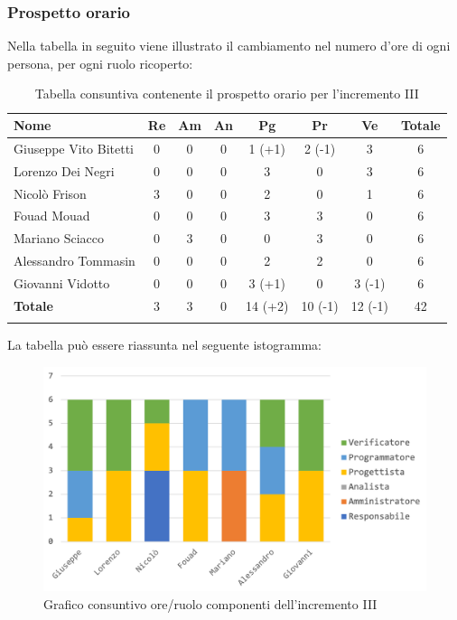 		\subsubsection{Prospetto orario}
			Nella tabella in seguito viene illustrato il cambiamento nel numero d'ore di ogni persona, per ogni ruolo ricoperto:
			
			\begin{longtable}{|l|c|c|c|c|c|c|c|}
				\hline
				\rowcolor{lighter-grayer}
				\textbf{Nome} & \textbf{Re} & \textbf{Am} & \textbf{An} & \textbf{Pg}  & \textbf{Pr}   & \textbf{Ve} & \textbf{Totale} \\
				\hline
				\endfirsthead
				\hline
				Giuseppe Vito Bitetti & 0 & 0 & 0 & 1 (+1) & 2 (-1) & 3 & 6\\
				\hline
				\hline
				Lorenzo Dei Negri & 0 & 0 & 0 & 3 & 0 & 3 & 6\\
				\hline
				\hline
				Nicolò Frison & 3 & 0 & 0 & 2 & 0 & 1 & 6 \\
				\hline
				\hline
				Fouad Mouad & 0 & 0 & 0 & 3 & 3 & 0 & 6\\
				\hline
				\hline
				Mariano Sciacco & 0 & 3 & 0 & 0 & 3 & 0 & 6 \\
				\hline
				\hline
				Alessandro Tommasin & 0 & 0 & 0 & 2 & 2 & 0 & 6\\
				\hline
				\hline
				Giovanni Vidotto & 0 & 0 & 0 & 3 (+1) & 0 & 3 (-1) & 6 \\
				\hline 
				\textbf{Totale} & 3 &  3 & 0 & 14 (+2) & 10 (-1) & 12 (-1) & 42 \\
				\hline 
				
				\caption{Tabella consuntiva contenente il prospetto orario per l'incremento III}
			\end{longtable}
			\pagebreak
			
			La tabella può essere riassunta nel seguente istogramma:
			
			\begin{figure}[H]
				\centering
				\includegraphics[width=0.8\linewidth]{images/consuntivo/ConsIncr3-1.png}
				\caption{Grafico consuntivo ore/ruolo componenti dell'incremento III}
				\label{fig:consuntivo grafico suddivione ruoli incremento III}
			\end{figure}
			
